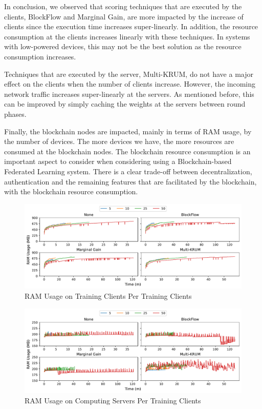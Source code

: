 In conclusion, we observed that scoring techniques that are executed by the clients, BlockFlow and Marginal Gain, are more impacted by the increase of clients since the execution time increases super-linearly. In addition, the resource consumption at the clients increases linearly with these techniques. In systems with low-powered devices, this may not be the best solution as the resource consumption increases.

Techniques that are executed by the server, Multi-KRUM, do not have a major effect on the clients when the number of clients increase. However, the incoming network traffic increases super-linearly at the servers. As mentioned before, this can be improved by simply caching the weights at the servers between round phases.

Finally, the blockchain nodes are impacted, mainly in terms of RAM usage, by the number of devices. The more devices we have, the more resources are consumed at the blockchain nodes. The blockchain resource consumption is an important aspect to consider when considering using a Blockchain-based Federated Learning system. There is a clear trade-off between decentralization, authentication and the remaining features that are facilitated by the blockchain, with the blockchain resource consumption.

\clearpage

\begin{figure}[!h]
    \centering
    \includegraphics[width=\textwidth]{graphics/clients/ram_client.pdf}
    \caption{RAM Usage on Training Clients Per Training Clients}
    \label{fig:ram_clients_clients}
\end{figure}

\vfill

\begin{figure}[!h]
    \centering
    \includegraphics[width=\textwidth]{graphics/clients/ram_server.pdf}
    \caption{RAM Usage on Computing Servers Per Training Clients}
    \label{fig:ram_clients_servers}
\end{figure}

